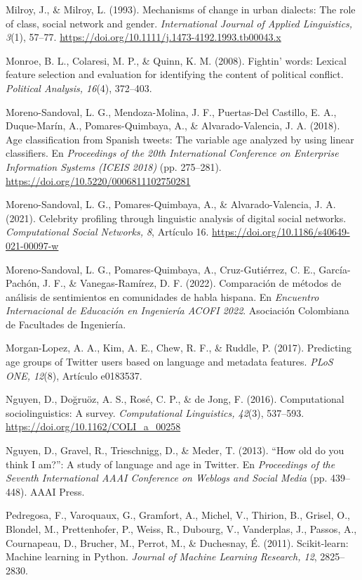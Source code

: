 \documentclass[10pt,twocolumn]{article}
\begin{document}
\begin{list}{}{\setlength{\leftmargin}{1.5em}\setlength{\itemindent}{-1.5em}\setlength{\itemsep}{2pt}\setlength{\parsep}{0pt}}
\item Milroy, J., \& Milroy, L. (1993). Mechanisms of change in urban dialects: The role of class, social network and gender. \textit{International Journal of Applied Linguistics, 3}(1), 57–77. \url{https://doi.org/10.1111/j.1473-4192.1993.tb00043.x} \textdagger{}
\item Monroe, B. L., Colaresi, M. P., \& Quinn, K. M. (2008). Fightin’ words: Lexical feature selection and evaluation for identifying the content of political conflict. \textit{Political Analysis, 16}(4), 372–403.
\item Moreno-Sandoval, L. G., Mendoza-Molina, J. F., Puertas-Del Castillo, E. A., Duque-Marín, A., Pomares-Quimbaya, A., \& Alvarado-Valencia, J. A. (2018). Age classification from Spanish tweets: The variable age analyzed by using linear classifiers. En \textit{Proceedings of the 20th International Conference on Enterprise Information Systems (ICEIS 2018)} (pp. 275–281). \url{https://doi.org/10.5220/0006811102750281} \textdagger{}
\item Moreno-Sandoval, L. G., Pomares-Quimbaya, A., \& Alvarado-Valencia, J. A. (2021). Celebrity profiling through linguistic analysis of digital social networks. \textit{Computational Social Networks, 8}, Artículo 16. \url{https://doi.org/10.1186/s40649-021-00097-w} \textdagger{}
\item Moreno-Sandoval, L. G., Pomares-Quimbaya, A., Cruz-Gutiérrez, C. E., García-Pachón, J. F., \& Vanegas-Ramírez, D. F. (2022). Comparación de métodos de análisis de sentimientos en comunidades de habla hispana. En \textit{Encuentro Internacional de Educación en Ingeniería ACOFI 2022}. Asociación Colombiana de Facultades de Ingeniería. \textdagger{}
\item Morgan-Lopez, A. A., Kim, A. E., Chew, R. F., \& Ruddle, P. (2017). Predicting age groups of Twitter users based on language and metadata features. \textit{PLoS ONE, 12}(8), Artículo e0183537.
\item Nguyen, D., Doğruöz, A. S., Rosé, C. P., \& de Jong, F. (2016). Computational sociolinguistics: A survey. \textit{Computational Linguistics, 42}(3), 537–593. \url{https://doi.org/10.1162/COLI_a_00258} \textdagger{}
\item Nguyen, D., Gravel, R., Trieschnigg, D., \& Meder, T. (2013). “How old do you think I am?”: A study of language and age in Twitter. En \textit{Proceedings of the Seventh International AAAI Conference on Weblogs and Social Media} (pp. 439–448). AAAI Press.
\item Pedregosa, F., Varoquaux, G., Gramfort, A., Michel, V., Thirion, B., Grisel, O., Blondel, M., Prettenhofer, P., Weiss, R., Dubourg, V., Vanderplas, J., Passos, A., Cournapeau, D., Brucher, M., Perrot, M., \& Duchesnay, É. (2011). Scikit-learn: Machine learning in Python. \textit{Journal of Machine Learning Research, 12}, 2825–2830. \textdagger{}

\end{list}
\end{document}
